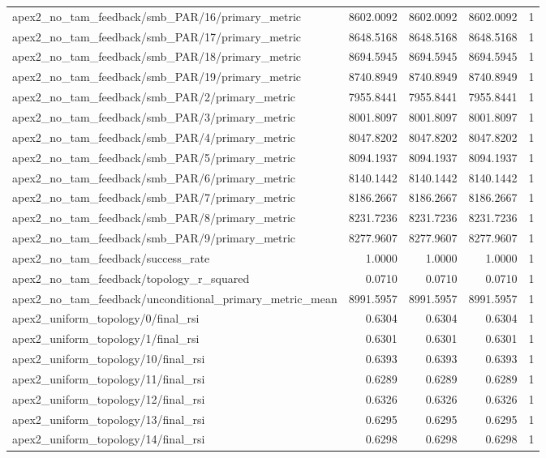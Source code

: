 \begin{table}[h]
\begin{tabular}{lrrrr}
apex2_no_tam_feedback/smb_PAR/16/primary_metric & 8602.0092 & 8602.0092 & 8602.0092 & 1 \\
apex2_no_tam_feedback/smb_PAR/17/primary_metric & 8648.5168 & 8648.5168 & 8648.5168 & 1 \\
apex2_no_tam_feedback/smb_PAR/18/primary_metric & 8694.5945 & 8694.5945 & 8694.5945 & 1 \\
apex2_no_tam_feedback/smb_PAR/19/primary_metric & 8740.8949 & 8740.8949 & 8740.8949 & 1 \\
apex2_no_tam_feedback/smb_PAR/2/primary_metric & 7955.8441 & 7955.8441 & 7955.8441 & 1 \\
apex2_no_tam_feedback/smb_PAR/3/primary_metric & 8001.8097 & 8001.8097 & 8001.8097 & 1 \\
apex2_no_tam_feedback/smb_PAR/4/primary_metric & 8047.8202 & 8047.8202 & 8047.8202 & 1 \\
apex2_no_tam_feedback/smb_PAR/5/primary_metric & 8094.1937 & 8094.1937 & 8094.1937 & 1 \\
apex2_no_tam_feedback/smb_PAR/6/primary_metric & 8140.1442 & 8140.1442 & 8140.1442 & 1 \\
apex2_no_tam_feedback/smb_PAR/7/primary_metric & 8186.2667 & 8186.2667 & 8186.2667 & 1 \\
apex2_no_tam_feedback/smb_PAR/8/primary_metric & 8231.7236 & 8231.7236 & 8231.7236 & 1 \\
apex2_no_tam_feedback/smb_PAR/9/primary_metric & 8277.9607 & 8277.9607 & 8277.9607 & 1 \\
apex2_no_tam_feedback/success_rate & 1.0000 & 1.0000 & 1.0000 & 1 \\
apex2_no_tam_feedback/topology_r_squared & 0.0710 & 0.0710 & 0.0710 & 1 \\
apex2_no_tam_feedback/unconditional_primary_metric_mean & 8991.5957 & 8991.5957 & 8991.5957 & 1 \\
apex2_uniform_topology/0/final_rsi & 0.6304 & 0.6304 & 0.6304 & 1 \\
apex2_uniform_topology/1/final_rsi & 0.6301 & 0.6301 & 0.6301 & 1 \\
apex2_uniform_topology/10/final_rsi & 0.6393 & 0.6393 & 0.6393 & 1 \\
apex2_uniform_topology/11/final_rsi & 0.6289 & 0.6289 & 0.6289 & 1 \\
apex2_uniform_topology/12/final_rsi & 0.6326 & 0.6326 & 0.6326 & 1 \\
apex2_uniform_topology/13/final_rsi & 0.6295 & 0.6295 & 0.6295 & 1 \\
apex2_uniform_topology/14/final_rsi & 0.6298 & 0.6298 & 0.6298 & 1 \\

\end{tabular}
\end{table}

